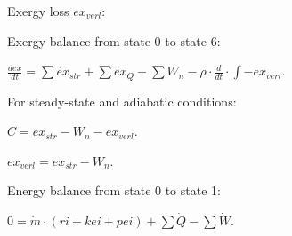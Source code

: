 Exergy loss \( ex_{verl} \):  

Exergy balance from state 0 to state 6:  

\( \frac{d ex}{dt} = \sum \dot{ex}_{str} + \sum \dot{ex}_{Q} - \sum W_n - \rho \cdot \frac{d}{dt} \cdot \int - ex_{verl} \).  

For steady-state and adiabatic conditions:  

\( C = ex_{str} - W_n - ex_{verl} \).  

\( ex_{verl} = ex_{str} - W_n \).  

Energy balance from state 0 to state 1:  

\( 0 = \dot{m} \cdot (ri + kei + pei) + \sum \dot{Q} - \sum \dot{W} \).